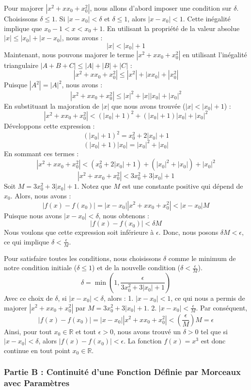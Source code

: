 \documentclass[12pt,a4paper]{report}
\begin{document}
Pour majorer $|x^2 + x x_0 + x_0^2|$, nous allons d'abord imposer une condition sur $\delta$. Choisissons $\delta \le 1$.
Si $|x - x_0| < \delta$ et $\delta \le 1$, alors $|x - x_0| < 1$.
Cette inégalité implique que $x_0 - 1 < x < x_0 + 1$.
En utilisant la propriété de la valeur absolue $|x| \le |x_0| + |x - x_0|$, nous avons :
$$
|x| < |x_0| + 1
$$
Maintenant, nous pouvons majorer le terme $|x^2 + x x_0 + x_0^2|$ en utilisant l'inégalité triangulaire $|A+B+C| \le |A| + |B| + |C|$ :
$$
|x^2 + x x_0 + x_0^2| \le |x^2| + |x x_0| + |x_0^2|
$$
Puisque $|A^2| = |A|^2$, nous avons :
$$
|x^2 + x x_0 + x_0^2| \le |x|^2 + |x||x_0| + |x_0|^2
$$
En substituant la majoration de $|x|$ que nous avons trouvée ($|x| < |x_0| + 1$) :
$$
|x^2 + x x_0 + x_0^2| < (|x_0| + 1)^2 + (|x_0| + 1)|x_0| + |x_0|^2
$$
Développons cette expression :
$$
(|x_0| + 1)^2 = x_0^2 + 2|x_0| + 1
$$
$$
(|x_0| + 1)|x_0| = |x_0|^2 + |x_0|
$$
En sommant ces termes :
$$
|x^2 + x x_0 + x_0^2| < (x_0^2 + 2|x_0| + 1) + (|x_0|^2 + |x_0|) + |x_0|^2
$$
$$
|x^2 + x x_0 + x_0^2| < 3x_0^2 + 3|x_0| + 1
$$
Soit $M = 3x_0^2 + 3|x_0| + 1$. Notez que $M$ est une constante positive qui dépend de $x_0$.
Alors, nous avons :
$$
|f(x) - f(x_0)| = |x - x_0| |x^2 + x x_0 + x_0^2| < |x - x_0| M
$$
Puisque nous avons $|x - x_0| < \delta$, nous obtenons :
$$
|f(x) - f(x_0)| < \delta M
$$
Nous voulons que cette expression soit inférieure à $\epsilon$. Donc, nous posons $\delta M < \epsilon$, ce qui implique $\delta < \frac{\epsilon}{M}$.

Pour satisfaire toutes les conditions, nous choisissons $\delta$ comme le minimum de notre condition initiale ($\delta \le 1$) et de la nouvelle condition ($\delta < \frac{\epsilon}{M}$).
$$
\delta = \min\left(1, \frac{\epsilon}{3x_0^2 + 3|x_0| + 1}\right)
$$
Avec ce choix de $\delta$, si $|x - x_0| < \delta$, alors :
1.  $|x - x_0| < 1$, ce qui nous a permis de majorer $|x^2 + x x_0 + x_0^2|$ par $M = 3x_0^2 + 3|x_0| + 1$.
2.  $|x - x_0| < \frac{\epsilon}{M}$.
Par conséquent,
$$
|f(x) - f(x_0)| = |x - x_0| |x^2 + x x_0 + x_0^2| < \left(\frac{\epsilon}{M}\right) M = \epsilon
$$
Ainsi, pour tout $x_0 \in \mathbb{R}$ et tout $\epsilon > 0$, nous avons trouvé un $\delta > 0$ tel que si $|x - x_0| < \delta$, alors $|f(x) - f(x_0)| < \epsilon$.
La fonction $f(x) = x^3$ est donc continue en tout point $x_0 \in \mathbb{R}$.

\subsubsection{Partie B : Continuité d'une Fonction Définie par Morceaux avec Paramètres}
\end{document}
